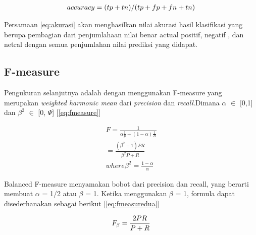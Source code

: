 \begin{equation}
\begin{split}
\tiny
accuracy = (tp+tn)/(tp+fp+fn+tn)
\label{eq:akurasi}
\normalsize
\end{split}
\end{equation}

Persamaan \ref{eq:akurasi} akan menghasilkan nilai akurasi hasil klasifikasi yang berupa pembagian dari penjumlahaan nilai benar actual positif, negatif , dan netral dengan semua penjumlahan nilai prediksi yang didapat.

\subsection*{F-measure}
Pengukuran selanjutnya adalah dengan menggunakan F-measure yang merupakan \textit{weighted harmonic mean} dari \textit{precision} dan \textit{recall}.Dimana $\alpha$ $\in$ [0,1] dan $\beta^2$ $\in$ [0, $\Psi$] [\ref{eq:fmeasure}]

\begin{equation}
\begin{split}
F = \frac{1}{\alpha \frac{1}{p} + (1 - \alpha)\frac{1}{R}} \\
= \frac{(\beta^2 + 1)PR}{\beta^2P + R} \\
where \beta^2 = \frac{1 - \alpha}{\alpha}
\label{eq:fmeasure}
\end{split}
\end{equation}


Balanced F-measure menyamakan bobot dari precision dan recall, yang berarti membuat $\alpha$ = 1/2 atau $\beta$ = 1. Ketika menggunakan $\beta$ = 1, formula dapat disederhanakan sebagai berikut  [\ref{eq:fmeasuredua}]

\begin{equation}
\begin{split}
\tiny
F_\beta = \frac{2PR}{P + R}
\label{eq:fmeasuredua}
\normalsize
\end{split}
\end{equation}

